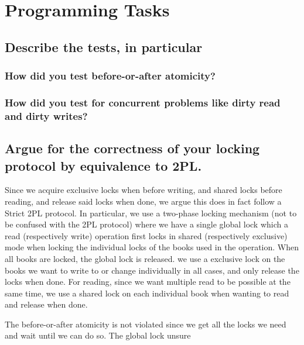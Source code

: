 
\section{Programming Tasks}

\subsection{Describe the tests, in particular}

\subsubsection{How did you test before-or-after atomicity?}

\subsubsection{How did you test for concurrent problems like dirty read and dirty writes?}

\subsection{Argue for the correctness of your locking protocol by equivalence to 2PL.}

Since we acquire exclusive locks when before writing, and shared locks before reading, and release said locks when done, we argue this does in fact follow a Strict 2PL protocol. In particular, we use a two-phase locking mechanism (not to be confused with the 2PL protocol) where we have a single global lock which a read (respectively write) operation first locks in shared (respectively exclusive) mode when locking the individual locks of the books used in the operation. When all books are locked, the global lock is released. we use a exclusive lock on the books we want to write to or change individually in all cases, and only release the locks when done. For reading, since we want multiple read to be possible at the same time, we use a shared lock on each individual book when wanting to read and release when done.

The before-or-after atomicity is not violated since we get all the locks we need and wait until we can do so. The global lock unsure


